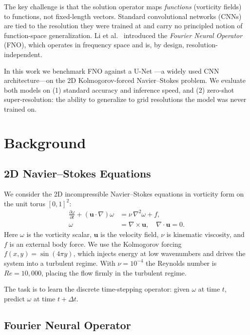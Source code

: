 \documentclass[11pt,twocolumn]{article}
\begin{document}
The key challenge is that the solution operator maps \emph{functions} (vorticity
fields) to functions, not fixed-length vectors.
Standard convolutional networks (CNNs) are tied to the resolution they were
trained at and carry no principled notion of function-space generalization.
Li et al.\ \cite{li2021fno} introduced the \emph{Fourier Neural Operator} (FNO),
which operates in frequency space and is, by design, resolution-independent.

In this work we benchmark FNO against a U-Net \cite{ronneberger2015unet}---a
widely used CNN architecture---on the 2D Kolmogorov-forced Navier--Stokes
problem.
We evaluate both models on (1) standard accuracy and inference speed, and (2)
zero-shot super-resolution: the ability to generalize to grid resolutions the
model was never trained on.

\section{Background}
\label{sec:background}

\subsection{2D Navier--Stokes Equations}

We consider the 2D incompressible Navier--Stokes equations in vorticity form on
the unit torus $[0,1]^2$:
\begin{align}
  \frac{\partial \omega}{\partial t} + (\mathbf{u} \cdot \nabla)\omega
    &= \nu\,\nabla^2 \omega + f, \label{eq:ns}\\
  \omega &= \nabla \times \mathbf{u}, \quad \nabla \cdot \mathbf{u} = 0.
\end{align}
Here $\omega$ is the vorticity scalar, $\mathbf{u}$ is the velocity field, $\nu$
is kinematic viscosity, and $f$ is an external body force.
We use the Kolmogorov forcing $f(x,y) = \sin(4\pi y)$, which injects energy at
low wavenumbers and drives the system into a turbulent regime.
With $\nu = 10^{-4}$ the Reynolds number is $Re = 10{,}000$, placing the flow
firmly in the turbulent regime.

The task is to learn the discrete time-stepping operator: given $\omega$ at time
$t$, predict $\omega$ at time $t + \Delta t$.

\subsection{Fourier Neural Operator}
\end{document}
